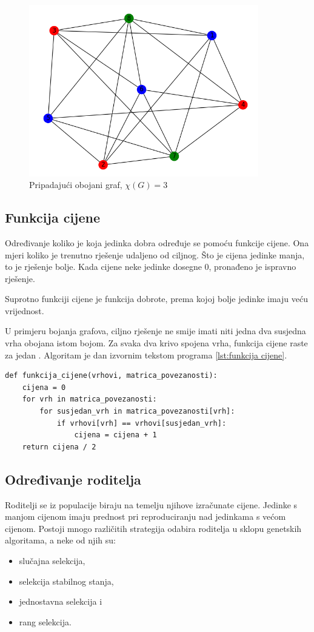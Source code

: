 \documentclass[times, utf8, zavrsni, numeric]{fer}
\begin{document}
\begin{figure}[htb]
\centering
\includegraphics[width=10cm]{images/genom_encoding_graph.png}
\caption{Pripadajući obojani graf, $\chi(G)=3$}
\label{fig:kodiranje genoma graf}
\end{figure}

\subsection{Funkcija cijene}
\label{sec:funkcija cijene}
Određivanje koliko je koja jedinka dobra određuje se pomoću funkcije cijene. Ona mjeri koliko je trenutno rješenje udaljeno od ciljnog. Što je cijena jedinke manja, to je rješenje bolje. Kada cijene neke jedinke dosegne 0, pronađeno je ispravno rješenje.

Suprotno funkciji cijene je funkcija dobrote, prema kojoj bolje jedinke imaju veću vrijednost.

U primjeru bojanja grafova, ciljno rješenje ne smije imati niti jedna dva susjedna vrha obojana istom bojom. Za svaka dva krivo spojena vrha, funkcija cijene raste za jedan \cite{geeksforgeeks}. Algoritam je dan izvornim tekstom programa \ref{lst:funkcija cijene}.

\begin{lstlisting}[caption=Funkcija cijene, label={lst:funkcija cijene}]
def funkcija_cijene(vrhovi, matrica_povezanosti):
    cijena = 0
    for vrh in matrica_povezanosti:
        for susjedan_vrh in matrica_povezanosti[vrh]:
            if vrhovi[vrh] == vrhovi[susjedan_vrh]:
                cijena = cijena + 1
    return cijena / 2
\end{lstlisting}

\subsection{Određivanje roditelja}
Roditelji se iz populacije biraju na temelju njihove izračunate cijene. Jedinke s manjom cijenom imaju prednost pri reproduciranju nad jedinkama s većom cijenom. Postoji mnogo različitih strategija odabira roditelja u sklopu genetskih algoritama, a neke od njih su:
\begin{itemize}
    \item slučajna selekcija,
    \item selekcija stabilnog stanja,
    \item jednostavna selekcija i
    \item rang selekcija.
\end{itemize}
\end{document}
